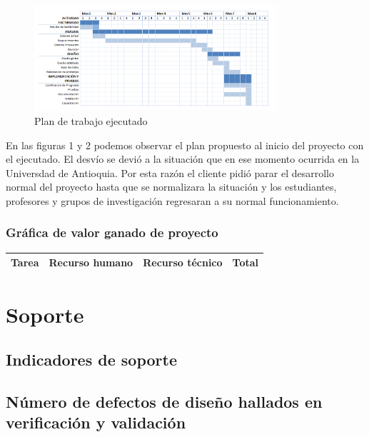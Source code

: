 \documentclass[a4paper,10pt]{article}
\begin{document}
\begin{figure}[h!]
  \centering
      \includegraphics[width=0.80\textwidth]{./img/cal2.png}
  \caption{Plan de trabajo ejecutado}
\end{figure}

\maketitle En las figuras 1 y 2 podemos observar el plan propuesto al inicio del proyecto con el ejecutado. El desvío se devió a la situación que en ese momento ocurrida en la Universdad de Antioquia. Por esta razón el cliente pidió parar el desarrollo normal del proyecto hasta que se normalizara la situación y los estudiantes, profesores y grupos de investigación regresaran a su normal funcionamiento.

\subsubsection{Gráfica de valor ganado de proyecto}

\begin{center}
\begin{tabular}{| c | c | c | c |}
\hline
Tarea & Recurso humano & Recurso técnico & Total \\
\hline
\end{tabular}
\end{center}

\section{Soporte}
\subsection{Indicadores de soporte}
\subsection{Número de defectos de diseño hallados en verificación y validación}
\end{document}
